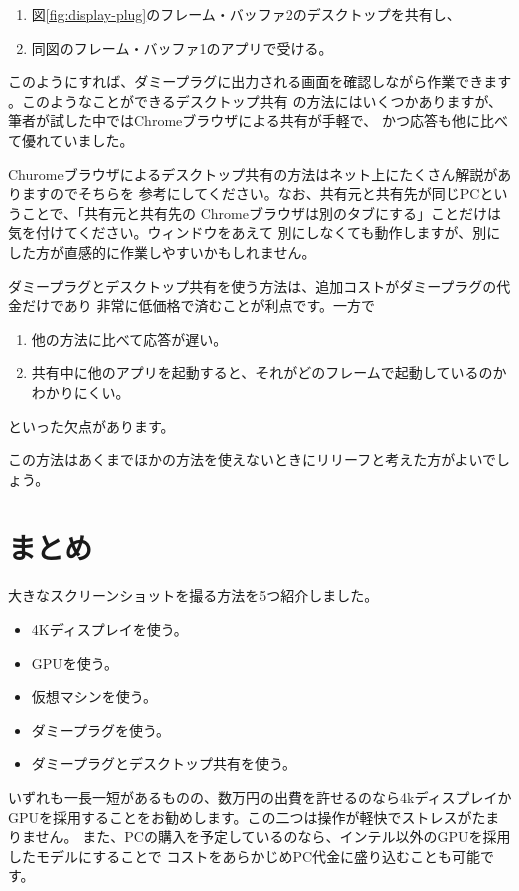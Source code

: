 \begin{enumerate}
  \item 図\ref{fig:display-plug}のフレーム・バッファ2のデスクトップを共有し、
  \item 同図のフレーム・バッファ1のアプリで受ける。
\end{enumerate}

このようにすれば、ダミープラグに出力される画面を確認しながら作業できます
。このようなことができるデスクトップ共有
の方法にはいくつかありますが、筆者が試した中ではChromeブラウザによる共有が手軽で、
かつ応答も他に比べて優れていました。

Churomeブラウザによるデスクトップ共有の方法はネット上にたくさん解説がありますのでそちらを
参考にしてください。なお、共有元と共有先が同じPCということで、「共有元と共有先の
Chromeブラウザは別のタブにする」ことだけは気を付けてください。ウィンドウをあえて
別にしなくても動作しますが、別にした方が直感的に作業しやすいかもしれません。

ダミープラグとデスクトップ共有を使う方法は、追加コストがダミープラグの代金だけであり
非常に低価格で済むことが利点です。一方で

\begin{enumerate}
  \item 他の方法に比べて応答が遅い。
  \item 共有中に他のアプリを起動すると、それがどのフレームで起動しているのかわかりにくい。
\end{enumerate}

といった欠点があります。

この方法はあくまでほかの方法を使えないときにリリーフと考えた方がよいでしょう。


\section{まとめ}
大きなスクリーンショットを撮る方法を5つ紹介しました。

\begin{itemize}
  \item 4Kディスプレイを使う。
  \item GPUを使う。
  \item 仮想マシンを使う。
  \item ダミープラグを使う。
  \item ダミープラグとデスクトップ共有を使う。
\end{itemize}

いずれも一長一短があるものの、数万円の出費を許せるのなら4kディスプレイか
GPUを採用することをお勧めします。この二つは操作が軽快でストレスがたまりません。
また、PCの購入を予定しているのなら、インテル以外のGPUを採用したモデルにすることで
コストをあらかじめPC代金に盛り込むことも可能です。

